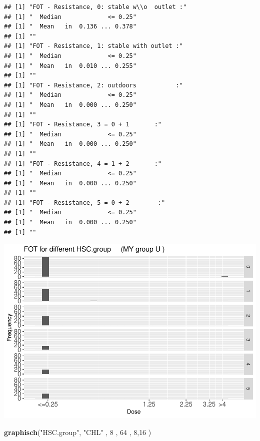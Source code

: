 \documentclass[
]{article}
\newenvironment{Shaded}{\begin{snugshade}}{\end{snugshade}}
\newcommand{\DecValTok}[1]{\textcolor[rgb]{0.00,0.00,0.81}{#1}}
\newcommand{\KeywordTok}[1]{\textcolor[rgb]{0.13,0.29,0.53}{\textbf{#1}}}
\newcommand{\NormalTok}[1]{#1}
\newcommand{\StringTok}[1]{\textcolor[rgb]{0.31,0.60,0.02}{#1}}
\begin{document}
\begin{verbatim}
## [1] "FOT - Resistance, 0: stable w\\o  outlet :"
## [1] "  Median             <= 0.25"
## [1] "  Mean   in  0.136 ... 0.378"
## [1] ""
## [1] "FOT - Resistance, 1: stable with outlet :"
## [1] "  Median             <= 0.25"
## [1] "  Mean   in  0.010 ... 0.255"
## [1] ""
## [1] "FOT - Resistance, 2: outdoors           :"
## [1] "  Median             <= 0.25"
## [1] "  Mean   in  0.000 ... 0.250"
## [1] ""
## [1] "FOT - Resistance, 3 = 0 + 1       :"
## [1] "  Median             <= 0.25"
## [1] "  Mean   in  0.000 ... 0.250"
## [1] ""
## [1] "FOT - Resistance, 4 = 1 + 2       :"
## [1] "  Median             <= 0.25"
## [1] "  Mean   in  0.000 ... 0.250"
## [1] ""
## [1] "FOT - Resistance, 5 = 0 + 2        :"
## [1] "  Median             <= 0.25"
## [1] "  Mean   in  0.000 ... 0.250"
## [1] ""
\end{verbatim}

\includegraphics{Verteilungen_files/figure-latex/unnamed-chunk-51-1.pdf}

\begin{Shaded}
\begin{Highlighting}[]
   \KeywordTok{graphisch}\NormalTok{(}\StringTok{"HSC.group"}\NormalTok{, }\StringTok{"CHL"}\NormalTok{ , }\DecValTok{8}\NormalTok{    ,  }\DecValTok{64}\NormalTok{   ,   }\DecValTok{8}\NormalTok{,}\DecValTok{16}\NormalTok{   ) }
\end{Highlighting}
\end{Shaded}
\end{document}
